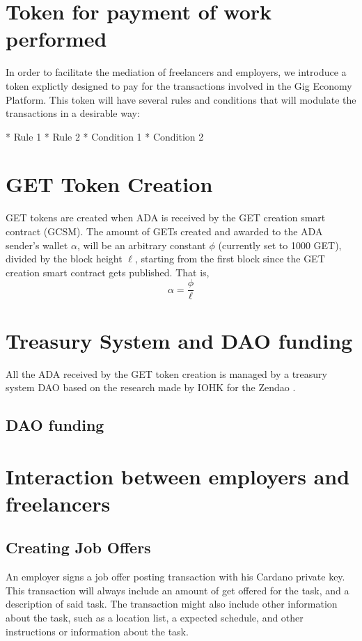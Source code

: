 \documentclass{article}
\begin{document}
\section{Token for payment of work performed}
In order to facilitate the mediation of freelancers and employers, we introduce a token explictly designed to pay for the transactions involved in the Gig Economy Platform. This token will have several rules and conditions that will modulate the transactions in a desirable way:

* Rule 1
* Rule 2
* Condition 1
* Condition 2

\section{GET Token Creation}
GET tokens are created when ADA is received by the GET creation smart contract (GCSM).
The amount of GETs created and awarded to the ADA sender's wallet $\alpha$, will be an arbitrary constant $\phi$ (currently set to 1000 GET), divided by the block height $\ell$, starting from the first block since the GET creation smart contract gets published. That is,
\[ \alpha
  = \dfrac{\phi}{\ell}
\]

\section{Treasury System and DAO funding}
All the ADA received by the GET token creation is managed by a treasury system DAO based on the research made by IOHK for the Zendao \cite{zhangb2}.
 
\subsection{DAO funding}

\section{Interaction between employers and freelancers}

\subsection{Creating Job Offers}
An employer signs a job offer posting transaction with his Cardano private key. This transaction will always include an amount of get offered for the task, and a description of said task. The transaction might also include other information about the task, such as a location list, a expected schedule, and other instructions or information about the task.
\end{document}

